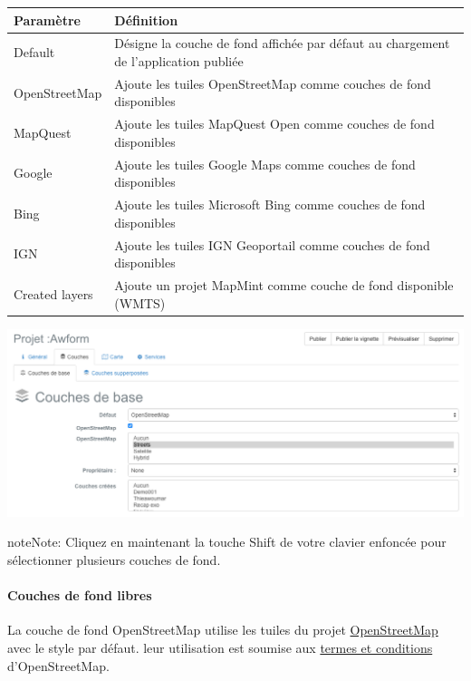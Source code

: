 \documentclass[letterpaper,10pt,french]{sphinxmanual}
\begin{document}
\begin{tabulary}{\linewidth}{|L|L|}
\hline

\textbf{Paramètre}
 & 
\textbf{Définition}
\\
\hline
Default
 & 
Désigne la couche de fond affichée par défaut au chargement de l'application publiée
\\
\hline
OpenStreetMap
 & 
Ajoute les tuiles OpenStreetMap comme couches de fond disponibles
\\
\hline
MapQuest
 & 
Ajoute les tuiles MapQuest Open comme couches de fond disponibles
\\
\hline
Google
 & 
Ajoute les tuiles Google Maps comme couches de fond disponibles
\\
\hline
Bing
 & 
Ajoute les tuiles Microsoft Bing comme couches de fond disponibles
\\
\hline
IGN
 & 
Ajoute les tuiles IGN Geoportail comme couches de fond disponibles
\\
\hline
Created layers
 & 
Ajoute un projet MapMint comme couche de fond disponible (WMTS)
\\
\hline\end{tabulary}


\includegraphics[width=1.000\linewidth]{publisher-baselayers-conf.png}

\begin{notice}{note}{Note:}
Cliquez en maintenant la touche Shift de votre clavier enfoncée pour sélectionner plusieurs couches de fond.
\end{notice}
\paragraph{Couches de fond libres}

La couche de fond OpenStreetMap utilise les tuiles du projet \href{http://www.openstreetmap.org}{OpenStreetMap} avec le style par défaut. leur utilisation est soumise aux \href{http://www.openstreetmap.org/copyright}{termes et conditions} d'OpenStreetMap.
\end{document}
